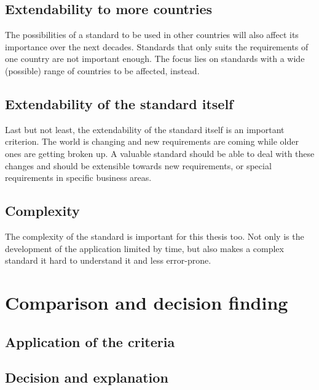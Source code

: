 \documentclass[english,mt]{lmedoc}
\begin{document}
\subsection{Extendability to more countries}
\label{sec2.2.3}
The possibilities of a standard to be used in other countries will also affect its importance over the next decades. Standards that only suits the requirements of one country are not important enough. The focus lies on standards with a wide (possible) range of countries to be affected, instead.

\subsection{Extendability of the standard itself}
\label{sec2.2.4}
Last but not least, the extendability of the standard itself is an important criterion. The world is changing and new requirements are coming while older ones are getting broken up. A valuable standard should be able to deal with these changes and should be extensible towards new requirements, or special requirements in specific business areas.

\subsection{Complexity}
\label{sec2.2.5}
The complexity of the standard is important for this thesis too. Not only is the development of the application limited by time, but also makes a complex standard it hard to understand it and less error-prone.

\section{Comparison and decision finding}
\label{sec2.3}

\subsection{Application of the criteria}
\label{sec2.3.1}

\subsection{Decision and explanation}
\label{sec2.3.2}


\appendix
\cleardoublepage
\cleardoublepage
\cleardoublepage
\cleardoublepage

\cleardoublepage
\cleardoublepage

{}

\end{document}
